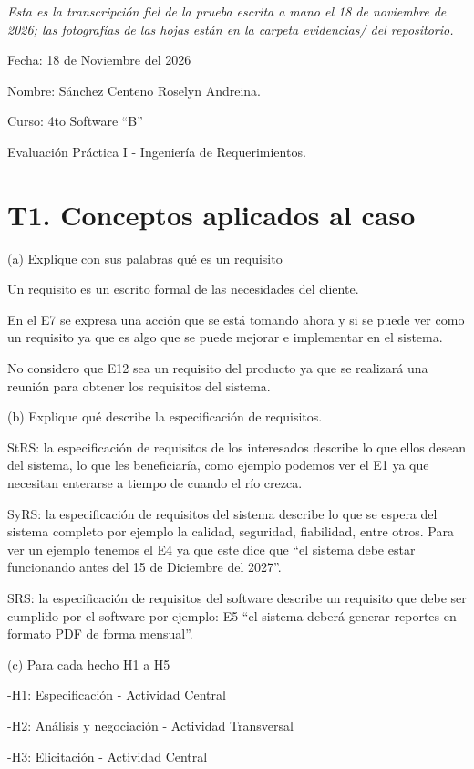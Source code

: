 \documentclass[11pt,a4paper]{article}
\begin{document}
\textit{Esta es la transcripción fiel de la prueba escrita a mano el 18 de noviembre de 2026; las fotografías de las hojas están en la carpeta evidencias/ del repositorio.}

\bigskip

Fecha: 18 de Noviembre del 2026

Nombre: Sánchez Centeno Roselyn Andreina.

Curso: 4to Software ``B''

Evaluación Práctica I - Ingeniería de Requerimientos.

\section*{T1. Conceptos aplicados al caso}

(a) Explique con sus palabras qué es un requisito

Un requisito es un escrito formal de las necesidades del cliente.

En el E7 se expresa una acción que se está tomando ahora y si se puede ver como un requisito ya que es algo que se puede mejorar e implementar en el sistema.

No considero que E12 sea un requisito del producto ya que se realizará una reunión para obtener los requisitos del sistema.

(b) Explique qué describe la especificación de requisitos.

StRS: la especificación de requisitos de los interesados describe lo que ellos desean del sistema, lo que les beneficiaría, como ejemplo podemos ver el E1 ya que necesitan enterarse a tiempo de cuando el río crezca.

SyRS: la especificación de requisitos del sistema describe lo que se espera del sistema completo por ejemplo la calidad, seguridad, fiabilidad, entre otros. Para ver un ejemplo tenemos el E4 ya que este dice que ``el sistema debe estar funcionando antes del 15 de Diciembre del 2027''.

SRS: la especificación de requisitos del software describe un requisito que debe ser cumplido por el software por ejemplo: E5 ``el sistema deberá generar reportes en formato PDF de forma mensual''.

(c) Para cada hecho H1 a H5

-H1: Especificación - Actividad Central

-H2: Análisis y negociación - Actividad Transversal

-H3: Elicitación - Actividad Central
\end{document}
